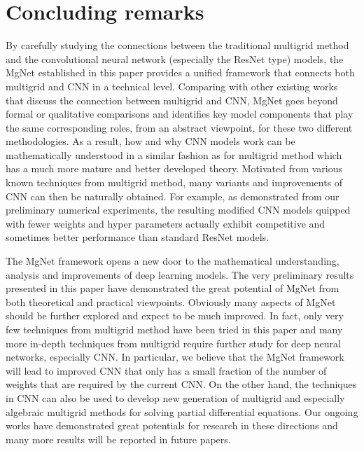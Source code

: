 \section{Concluding remarks}\label{sec:conclusion}
By carefully studying the connections between the traditional
multigrid method and the convolutional neural network (especially the
ResNet type) models, the MgNet established in this paper provides a
unified framework that connects both multigrid and CNN in a technical
level.  Comparing with other existing works that discuss the
connection between multigrid and CNN, MgNet goes beyond formal or
qualitative comparisons and identifies key model components that play
the same corresponding roles, from an abstract viewpoint, for these two different
methodologies.  As a result, how and why CNN models work can be
mathematically understood in a similar fashion as for multigrid method
which has a much more mature and better developed theory.  Motivated
from various known techniques from multigrid method, many variants and
improvements of CNN can then be naturally obtained.  For example, as
demonstrated from our preliminary numerical experiments, the resulting
modified CNN models quipped with fewer weights and hyper parameters
actually exhibit competitive and sometimes better performance than
standard ResNet models.

The MgNet framework opens a new door to the
mathematical understanding, analysis and improvements of deep learning
models.  The very preliminary results presented in
this paper have demonstrated the great potential of MgNet from both
theoretical and practical viewpoints.  Obviously many aspects of MgNet
should be further explored and expect to be much improved.  In fact, only very
few techniques from multigrid method have been tried in this paper and
many more in-depth techniques from multigrid require further study for
deep neural networks, especially CNN.  
In particular, we believe that the MgNet framework will
lead to improved CNN that only has a small fraction of the number
of weights that are required by the current CNN. On the other hand,
the techniques in CNN can also be used to develop new generation of multigrid
and especially  algebraic multigrid methods \cite{xu2017algebraic} for solving
partial differential equations. Our ongoing works have
demonstrated great potentials for research in these directions and  many
more results will be reported in future papers. 